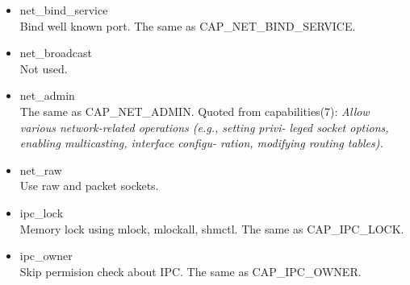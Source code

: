 \documentclass{article}
\begin{document}
\begin{itemize}
  \item net\_bind\_service\\
	  Bind well known port.    The same as CAP\_NET\_BIND\_SERVICE.

  \item net\_broadcast\\
	  Not used.
	  
  \item net\_admin\\
	  The same as  CAP\_NET\_ADMIN. Quoted from capabilities(7):{\it
	  Allow various network-related operations (e.g.,  setting  privi-
	  leged  socket options, enabling multicasting, interface configu-
	  ration, modifying routing tables). }
	  
  \item net\_raw\\
	  Use raw and packet sockets. 
  \item ipc\_lock\\
	  Memory lock using mlock, mlockall, shmctl. The same as
	  CAP\_IPC\_LOCK.
	  
  \item ipc\_owner\\
	 Skip permision check about IPC. The same as  CAP\_IPC\_OWNER.
	  

\end{itemize}
\end{document}
